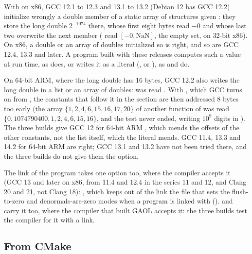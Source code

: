 \begin{Rem}\label{rem:gcc12-denorm}
With  on x86, GCC 12.1 to 12.3 and 13.1 to 13.2
(Debian 12 has GCC 12.2) initialize wrongly a double member of a static array
of structures given : they
store the long double $2^{-1074}$ there, whose first eight bytes read $-0$ and
whose last two overwrite the next member ( read $[-0, \mathrm{NaN}]$, the empty set, on 32-bit x86). On x86, a double or
an array of doubles initialized so is right, and so are GCC 12.4, 13.3 and
later. A program built with these releases computes such a value at run time,
as  does, or writes it as a literal
(, or ), as
 and 
do.\newinvfive

On 64-bit ARM, where the long double has 16 bytes, GCC 12.2 also writes the
long double in a list or an array of doubles:  was read . With
, which GCC turns on from , the
constants that follow it in the section are then addressed 8 bytes too early
(the  array $\{1, 2, 4, 6, 15, 16, 17, 20\}$ of another function of
 was read $\{0, 1074790400, 1, 2, 4, 6, 15, 16\}$, and
the test never ended, writing $10^9$ digits in ). The three
builds give GCC 12 for 64-bit ARM , which mends
the offsets of the other constants, not the list itself, which the literal
mends. GCC 11.4, 13.3 and 14.2 for 64-bit ARM are right; GCC 13.1 and 13.2 have
not been tried there, and the three builds do not give them the option.\newinvfive
\end{Rem}

The link of the program takes one option too, where the compiler accepts it
(GCC 13 and later on x86, from 11.4 and 12.4 in the series 11 and 12, and Clang 20
and 21, not Clang 18):
, which keeps out of the link the file that sets the
flush-to-zero and denormals-are-zero modes when a program is linked with
 ().  and  carry
it too, where the compiler that built GAOL accepts it: the three builds test
the compiler for it with a link.\newinvfive

\subsection{From CMake}\label{sec:compiling-cmake}
%

